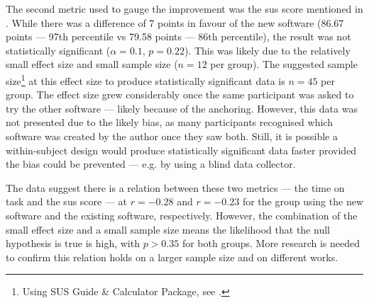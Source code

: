 {The second metric used to gauge the improvement was the \gls{sus} score mentioned in .
While there was a difference of 7 points in favour of the new software (86.67 points --- 97th percentile vs 79.58 points --- 86th percentile), the result was not statistically significant ($\alpha=0.1$, $p=0.22$).
This was likely due to the relatively small effect size and small sample size ($n=12$ per group).
The suggested sample size\footnote{Using SUS Guide \& Calculator Package, see .} at this effect size to produce statistically significant data is $n=45$ per group.
The effect size grew considerably once the same participant was asked to try the other software --- likely because of the anchoring.
However, this data was not presented due to the likely bias, as many participants recognised which software was created by the author once they saw both.
Still, it is possible a within-subject design would produce statistically significant data faster provided the bias could be prevented --- e.g. by using a blind data collector.

The data suggest there is a relation between these two metrics --- the time on task and the \gls{sus} score --- at $r=-0.28$ and $r=-0.23$ for the group using the new software and the existing software, respectively.
However, the combination of the small effect size and a small sample size means the likelihood that the null hypothesis is true is high, with $p > 0.35$ for both groups.
More research is needed to confirm this relation holds on a larger sample size and on different works.

}

